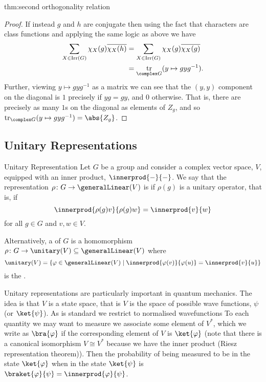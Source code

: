 \documentclass[fleqn]{NotesClass}
\newcommand{\isomorphic}{\cong}
\DeclareMathOperator{\Irr}{Irr}
\DeclareMathOperator{\tr}{tr}
\begin{document}
\begin{thm}{}{thm:second orthogonality relation}
\begin{proof}
            If instead \(g\) and \(h\) are conjugate then using the fact that characters are class functions and applying the same logic as above we have
            \begin{align}
                \sum_{X \in \Irr(G)} \chi_X(g) \overline{\chi_X(h)} &= \sum_{X \in \Irr(G)} \chi_X(g) \overline{\chi_X(g)}\\
                &= \tr_{\complex G}(y \mapsto gyg^{-1}).
            \end{align}
            Further, viewing \(y \mapsto gyg^{-1}\) as a matrix we can see that the \((y, y)\) component on the diagonal is \(1\) precisely if \(yg = gy\), and \(0\) otherwise.
            That is, there are precisely as many \(1\)s on the diagonal as elements of \(Z_g\), and so \(\tr_{\complex G}(y \mapsto gyg^{-1}) = \abs{Z_g}\).
        \end{proof}
    \end{thm}
    
    \subsection{Unitary Representations}
    \begin{dfn}{Unitary Representation}{}
        Let \(G\) be a group and consider a complex vector space, \(V\), equipped with an inner product, \(\innerprod{-}{-}\).
        We say that the representation \(\rho \colon G \to \generalLinear(V)\) is  if \(\rho(g)\) is a unitary operator, that is, if
        \begin{equation}
            \innerprod{\rho(g)v}{\rho(g)w} = \innerprod{v}{w}
        \end{equation}
        for all \(g \in G\) and \(v, w \in V\).
        
        Alternatively, a  of \(G\) is a homomorphism \(\rho \colon G \to \unitary(V) \subseteq \generalLinear(V)\) where
        \begin{equation}
            \unitary(V) = \{\varphi \in \generalLinear(V) \mid \innerprod{\varphi(v)}{\varphi(u)} = \innerprod{v}{u}\}
        \end{equation}
        is the .
    \end{dfn}
    
    Unitary representations are particularly important in quantum mechanics.
    The idea is that \(V\) is a state space, that is \(V\) is the space of possible wave functions, \(\psi\) (or \(\ket{\psi}\)).
    As is standard we restrict to normalised wavefunctions
    To each quantity we may want to measure we associate some element of \(V^*\), which we write as \(\bra{\varphi}\) if the corresponding element of \(V\) is \(\ket{\varphi}\) (note that there is a canonical isomorphism \(V \isomorphic V^*\) because we have the inner product (Riesz representation theorem)).
    Then the probability of being measured to be in the state \(\ket{\varphi}\) when in the state \(\ket{\psi}\) is \(\braket{\varphi}{\psi} = \innerprod{\varphi}{\psi}\).
    
\end{document}
